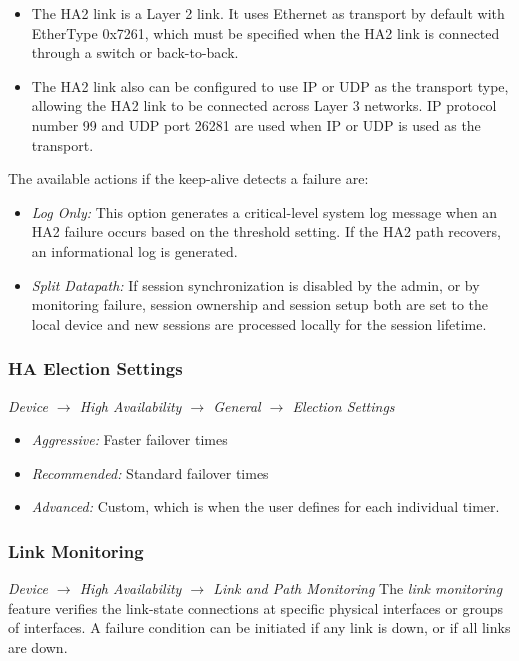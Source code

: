 \begin{itemize}
    \item The HA2 link is a Layer 2 link. It uses Ethernet as transport by default with EtherType 0x7261, which must be specified when the HA2 link is connected through a switch or back-to-back.
    \item The HA2 link also can be configured to use IP or UDP as the transport type, allowing the HA2 link to be connected across Layer 3 networks.
    IP protocol number 99 and UDP port 26281 are used when IP or UDP is used as the transport.
\end{itemize}
The available actions if the keep-alive detects a failure are:
\begin{itemize}
    \item \textit{Log Only:} This option generates a critical-level system log message when an HA2 failure occurs based on the threshold setting.
    If the HA2 path recovers, an informational log is generated.
    \item \textit{Split Datapath:} If session synchronization is disabled by the admin, or by monitoring failure, session ownership and session setup both are set to the local device and new sessions are processed locally for the session lifetime.
\end{itemize}

\subsubsection{HA Election Settings}
\textit{Device $\rightarrow$ High Availability $\rightarrow$ General $\rightarrow$ Election Settings}
\newline
\begin{itemize}
    \item \textit{Aggressive:} Faster failover times
    \item \textit{Recommended:} Standard failover times
    \item \textit{Advanced:} Custom, which is when the user defines for each individual timer.
\end{itemize}

\subsubsection{Link Monitoring}
\textit{Device $\rightarrow$ High Availability $\rightarrow$ Link and Path Monitoring}
\newline
The \textit{link monitoring} feature verifies the link-state connections at specific physical interfaces or groups of interfaces.
A failure condition can be initiated if any link is down, or if all links are down.

